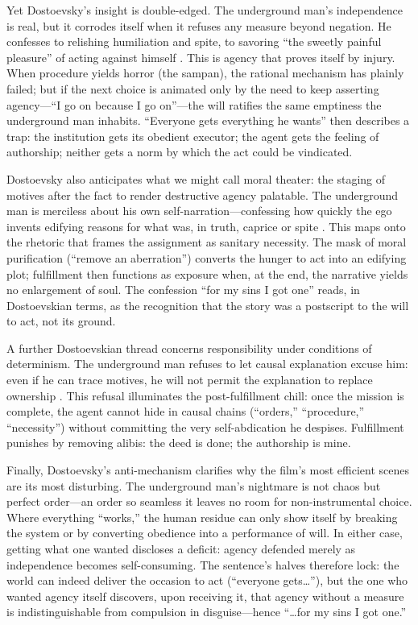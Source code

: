 Yet Dostoevsky's insight is double-edged. The underground man's independence is real, but it
corrodes itself when it refuses any measure beyond negation. He confesses to relishing
humiliation and spite, to savoring ``the sweetly painful pleasure'' of acting against himself
\parencite[pp.~108--115]{DostoevskyNFU1994}. This is agency that proves itself by injury.
When procedure yields horror (the sampan), the rational mechanism has plainly failed; but if
the next choice is animated only by the need to keep asserting agency—``I go on because I go
on''—the will ratifies the same emptiness the underground man inhabits. ``Everyone gets
everything he wants'' then describes a trap: the institution gets its obedient executor; the
agent gets the feeling of authorship; neither gets a norm by which the act could be vindicated.

Dostoevsky also anticipates what we might call moral theater: the staging of motives after the
fact to render destructive agency palatable. The underground man is merciless about his own
self-narration—confessing how quickly the ego invents edifying reasons for what was, in truth,
caprice or spite \parencite[pp.~103--107]{DostoevskyNFU1994}. This maps onto the rhetoric that
frames the assignment as sanitary necessity. The mask of moral purification (``remove an
aberration'') converts the hunger to act into an edifying plot; fulfillment then functions as
exposure when, at the end, the narrative yields no enlargement of soul. The confession ``for my
sins I got one'' reads, in Dostoevskian terms, as the recognition that the story was a postscript
to the will to act, not its ground.

A further Dostoevskian thread concerns responsibility under conditions of determinism. The
underground man refuses to let causal explanation excuse him: even if he can trace motives, he
will not permit the explanation to replace ownership \parencite[pp.~109--113]{DostoevskyNFU1994}.
This refusal illuminates the post-fulfillment chill: once the mission is complete, the agent
cannot hide in causal chains (``orders,'' ``procedure,'' ``necessity'') without committing the
very self-abdication he despises. Fulfillment punishes by removing alibis: the deed is done;
the authorship is mine.

Finally, Dostoevsky's anti-mechanism clarifies why the film's most efficient scenes are its most
disturbing. The underground man's nightmare is not chaos but perfect order—an order so seamless
it leaves no room for non-instrumental choice. Where everything ``works,'' the human residue can
only show itself by breaking the system or by converting obedience into a performance of will.
In either case, getting what one wanted discloses a deficit: agency defended merely as
independence becomes self-consuming. The sentence's halves therefore lock: the world can indeed
deliver the occasion to act (``everyone gets\ldots''), but the one who wanted agency itself
discovers, upon receiving it, that agency without a measure is indistinguishable from compulsion
in disguise—hence ``\ldots for my sins I got one.''
